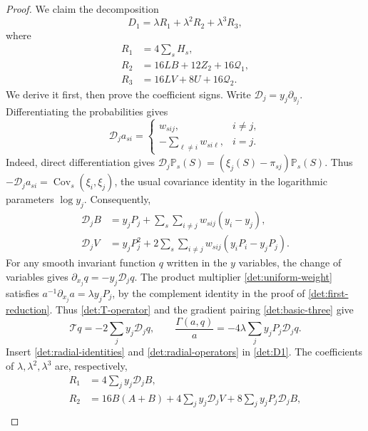 \begin{proof}
We claim the decomposition
\begin{equation}\label{det:D1-positive-formula}
 D_1=\lambda R_1+\lambda^2R_2+\lambda^3R_3,
\end{equation}
where
\begin{align}
 R_1&=4\sum_sH_s,\label{det:R1}\\
 R_2&=16LB+12Z_2+16\mathcal Q_1,\label{det:R2}\\
 R_3&=16LV+8U+16\mathcal Q_2.\label{det:R3}
\end{align}
We derive it first, then prove the coefficient signs.
Write
$\mathscr D_j=y_j\partial_{y_j}$.  Differentiating the probabilities gives
\begin{equation}\label{det:probability-derivative}
 \mathscr D_j a_{si}
 =\begin{cases}
   w_{sij},&i\ne j,\\
   -\sum_{\ell\ne i}w_{si\ell},&i=j.
  \end{cases}
\end{equation}
Indeed, direct differentiation gives
\(\mathscr D_j\mathbb P_s(S)=(\xi_j(S)-\pi_{sj})\mathbb P_s(S)\).
Thus \(-\mathscr D_j a_{si}=\operatorname{Cov}_s(\xi_i,\xi_j)\),
the usual covariance identity in the logarithmic parameters
\(\log y_j\).
Consequently,
\begin{align}
 \mathscr D_jB
 &=y_jP_j+\sum_s\sum_{i\ne j}w_{sij}(y_i-y_j),
 \label{det:DB}\\
 \mathscr D_jV
 &=y_jP_j^2+2\sum_s\sum_{i\ne j}w_{sij}(y_iP_i-y_jP_j).
 \label{det:DV}
\end{align}
For any smooth invariant function $q$ written in the $y$ variables,
the change of variables gives
$\partial_{x_j}q=-y_j\mathscr D_jq$.
The product multiplier \eqref{det:uniform-weight} satisfies
$a^{-1}\partial_{x_j}a=\lambda y_jP_j$, by the complement identity
in the proof of \cref{det:first-reduction}.
Thus \eqref{det:T-operator} and the gradient pairing
\eqref{det:basic-three} give
\begin{equation}\label{det:radial-operators}
 \mathcal Tq=-2\sum_j y_j\mathscr D_jq,\qquad
 \frac{\Gamma(a,q)}a=-4\lambda\sum_j y_jP_j\mathscr D_jq.
\end{equation}
Insert \eqref{det:radial-identities} and
\eqref{det:radial-operators} in \eqref{det:D1}.  The coefficients of
$\lambda,\lambda^2,\lambda^3$ are, respectively,
\begin{align*}
 R_1&=4\sum_jy_j\mathscr D_jB,\\
 R_2&=16B(A+B)+4\sum_jy_j\mathscr D_jV
                       +8\sum_jy_jP_j\mathscr D_jB,\\

\end{align*}
\end{proof}
